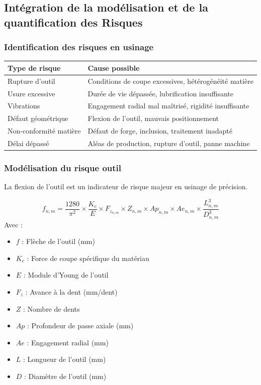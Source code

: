 \documentclass{article}
\begin{document}
\subsection{Intégration de la modélisation et de la quantification des Risques}

\subsubsection{Identification des risques en usinage}

\begin{table}[h]
\centering
\begin{tabular}{|p{}|p{}|}
\hline
\textbf{Type de risque} & \textbf{Cause possible} \\
\hline
Rupture d'outil & Conditions de coupe excessives, hétérogénéité matière \\
Usure excessive & Durée de vie dépassée, lubrification insuffisante \\
Vibrations & Engagement radial mal maîtrisé, rigidité insuffisante \\
Défaut géométrique & Flexion de l'outil, mauvais positionnement \\
Non-conformité matière & Défaut de forge, inclusion, traitement inadapté \\
Délai dépassé & Aléas de production, rupture d'outil, panne machine \\
\hline
\end{tabular}
\end{table}

\subsubsection{Modélisation du risque outil}

La flexion de l'outil est un indicateur de risque majeur en usinage de précision.

\begin{tcolorbox}[colback=blueclair, colframe=blue!70!black, title=Calcul de la flexion de l'outil]
\[
f_{n,m} = \frac{1280}{\pi^2} \times \frac{K_c}{E} \times F_{z_{n,m}} \times Z_{n,m} \times Ap_{n,m} \times Ae_{n,m} \times \frac{L_{n,m}^3}{D_{n,m}^3}
\]
Avec :
\begin{itemize}
    \item $f$ : Flèche de l'outil (mm)
    \item $K_c$ : Force de coupe spécifique du matériau
    \item $E$ : Module d'Young de l'outil
    \item $F_z$ : Avance à la dent (mm/dent)
    \item $Z$ : Nombre de dents
    \item $Ap$ : Profondeur de passe axiale (mm)
    \item $Ae$ : Engagement radial (mm)
    \item $L$ : Longueur de l'outil (mm)
    \item $D$ : Diamètre de l'outil (mm)
\end{itemize}
\end{tcolorbox}
\end{document}
